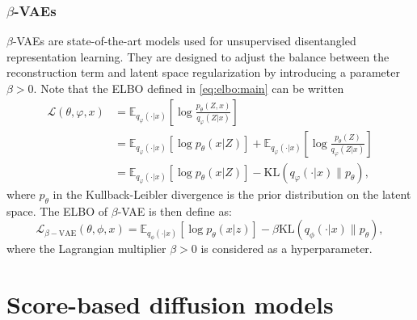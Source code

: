 \documentclass[english,graybox,envcountchap,envcountsame,sectrefs,shortlabels]{svmono}
\theoremstyle{style}
\newcommand{\eqsp}{}
\begin{document}
\subsection{$\beta$-VAEs}
$\beta$-VAEs  are state-of-the-art models used for unsupervised disentangled representation learning. They are designed to adjust the balance between the reconstruction term and latent space regularization by introducing a parameter $\beta>0$.
Note that the ELBO defined in \eqref{eq:elbo:main} can be written
\begin{align*}
\mathcal{L}(\theta,\varphi,x) &= \mathbb{E}_{q_{\varphi}(\cdot|x)}\left[\log \frac{p_\theta(Z,x)}{q_{\varphi}(Z|x)}\right]\\
&= \mathbb{E}_{q_{\varphi}(\cdot|x)}\left[\log p_\theta(x|Z)\right] + \mathbb{E}_{q_{\varphi}(\cdot|x)}\left[\log \frac{p_\theta(Z)}{q_{\varphi}(Z|x)}\right]\\
&=\mathbb{E}_{q_{\varphi}(\cdot|x)}\left[\log p_\theta(x|Z)\right] - \mathrm{KL} (q_{\varphi}(\cdot|x)\|p_\theta)\eqsp,
\end{align*}
where $p_\theta$ in the Kullback-Leibler divergence is the prior distribution on the latent space. The ELBO of $\beta$-VAE is then define as:
$$
\mathcal{L}_{\beta-\text{VAE}}(\theta, \phi, x) = \mathbb{E}_{q_\phi(\cdot|x)}\left[\log p_\theta(x|z)\right] - \beta \mathrm{KL}(q_\phi(\cdot|x)\|p_\theta)\eqsp,
$$
where the Lagrangian multiplier $\beta>0$ is considered as a hyperparameter.




\chapter{Score-based diffusion models}
\minitoc

\end{document}
